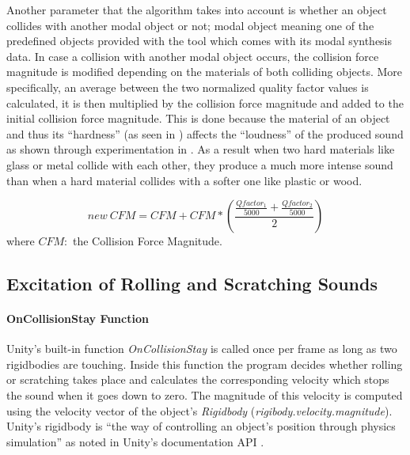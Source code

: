 Another parameter that the algorithm takes into account is whether an object collides with another modal object or not; modal object meaning one of the predefined objects provided with the tool which comes with its modal synthesis data. In case a collision with another modal object occurs, the collision force magnitude is modified depending on the materials of both colliding objects. More specifically, an average between the two normalized quality factor values is calculated, it is then multiplied by the collision force magnitude and added to the initial collision force magnitude. This is done because the material of an object and thus its ``hardness'' (as seen in \cite{giordano2003material}) affects the ``loudness'' of the produced sound as shown through experimentation in \cite{freed1990auditory}. As a result when two hard materials like glass or metal collide with each other, they produce a much more intense sound than when a hard material collides with a softer one like plastic or wood.  

\begin{equation}
new\ CFM = CFM + CFM*\left( \frac{\frac{Qfactor_1}{5000} + \frac{Qfactor_2}{5000}}{2} \right)
\end{equation} 
\noindent where $CFM:$ the Collision Force Magnitude.


\subsection{Excitation of Rolling and Scratching Sounds}
\paragraph{OnCollisionStay Function}
\hfill \break

Unity\textsuperscript{\textregistered}'s built-in function \textit{OnCollisionStay} \cite{bib:unity_doc} is called once per frame as long as two rigidbodies are touching. Inside this function the program decides whether rolling or scratching takes place and calculates the corresponding velocity which stops the sound when it goes down to zero. The magnitude of this velocity is computed using the velocity vector of the object's \textit{Rigidbody} (\textit{rigibody.velocity.magnitude}). Unity\textsuperscript{\textregistered}'s rigidbody is ``the way of controlling an object's position through physics simulation'' as noted in Unity\textsuperscript{\textregistered}'s documentation API \cite{bib:unity_doc}.

